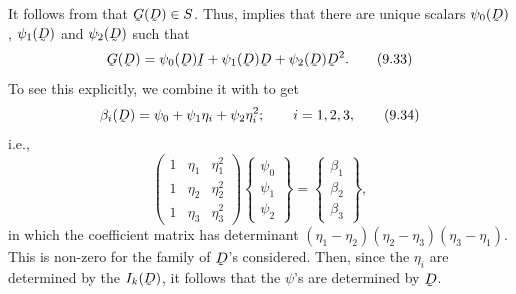 It follows from  that $\bG(\bD)\in S$. Thus, 
implies that there are unique scalars $\psi_{0}(\bD)$, $\psi_{1}(\bD)$
and $\psi_{2}(\bD)$ such that
\begin{equation}
   \bG(\bD)=\psi_{0}(\bD)\I+\psi_{1}(\bD)\bD+\psi_{2}(\bD)\bD^{2}.
   \tag{9.33}\label{eq:9.33}
\end{equation}
To see this explicitly, we combine it with  to get
\begin{equation}
   \beta_{i}(\bD)=\psi_{0}+\psi_{1}\eta_{i}+\psi_{2}\eta_{i}^{2};
   \qquad i=1,2,3,
   \tag{9.34}\label{eq:9.34}
\end{equation}
i.e.,
\begin{equation}
   \begin{pmatrix}
      1&\eta_{1}&\eta_{1}^{2}\\
      1&\eta_{2}&\eta_{2}^{2}\\
      1&\eta_{3}&\eta_{3}^{2}
   \end{pmatrix}
   \begin{Bmatrix}\psi_{0}\\ \psi_{1}\\ \psi_{2}\end{Bmatrix}
   =\begin{Bmatrix}\beta_{1}\\ \beta_{2}\\ \beta_{3}\end{Bmatrix},
   \tag{9.35}\label{eq:9.35}
\end{equation}
in which the coefficient matrix has determinant
$(\eta_{1}-\eta_{2})(\eta_{2}-\eta_{3})(\eta_{3}-\eta_{1})$. This is
non-zero for the family of $\bD$'s considered. Then, since the
$\eta_{i}$ are determined by the $I_{k}(\bD)$, it follows that the
$\psi$'s are determined by $\bD$.

